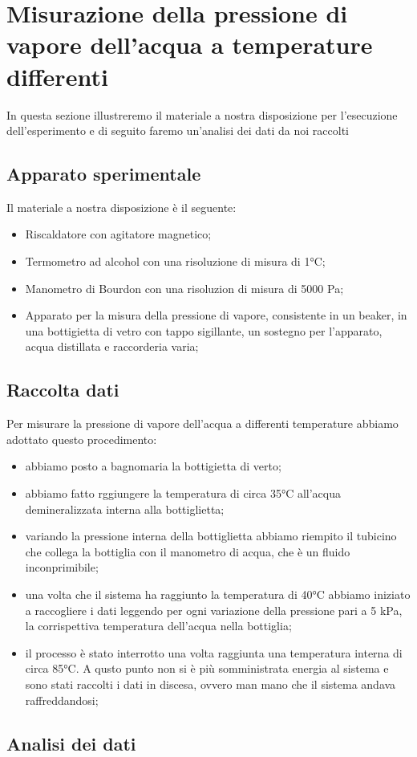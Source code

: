 \section{Misurazione della pressione di vapore dell'acqua a temperature differenti}

In questa sezione illustreremo il materiale a nostra disposizione per l'esecuzione dell'esperimento e di seguito faremo un'analisi dei dati da noi raccolti

\subsection{Apparato sperimentale}

Il materiale a nostra disposizione è il seguente:
\begin{itemize}
	\item{Riscaldatore con agitatore magnetico;}
	\item{Termometro ad alcohol con una risoluzione di misura di 1°C;}
	\item{Manometro di Bourdon con una risoluzion di misura di 5000 Pa;}
	\item{Apparato per la misura della pressione di vapore, consistente in un beaker, in una bottigietta di vetro con tappo sigillante, un sostegno per l'apparato, acqua distillata e raccorderia varia;}
\end{itemize}

\subsection{Raccolta dati}

Per misurare la pressione di vapore dell'acqua a differenti temperature abbiamo adottato questo procedimento:

\begin{itemize}
	\item{abbiamo posto a bagnomaria la bottigietta di verto;}
	\item{abbiamo fatto rggiungere la temperatura di circa 35°C all'acqua demineralizzata interna alla bottiglietta;}
	\item{variando la pressione interna della bottiglietta abbiamo riempito il tubicino che collega la bottiglia con il manometro di acqua, che è un fluido inconprimibile;}
	\item{una volta che il sistema ha raggiunto la temperatura di 40°C abbiamo iniziato a raccogliere i dati leggendo per ogni variazione della pressione pari a 5 kPa, la corrispettiva temperatura dell'acqua nella bottiglia;}
	\item{il processo è stato interrotto una volta raggiunta una temperatura interna di circa 85°C. A qusto punto non si è più somministrata energia al sistema e sono stati raccolti i dati in discesa, ovvero man mano che il sistema andava raffreddandosi;}
\end{itemize}

\subsection{Analisi dei dati}

